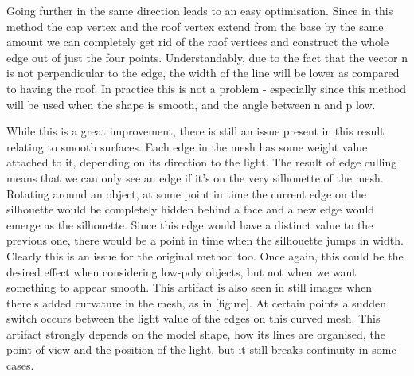 \documentclass[a4paper, 12pt]{article}
\begin{document}
Going further in the same direction leads to an easy optimisation. Since in this method the cap vertex and the roof vertex extend from the base by the same amount we can  completely get rid of the roof vertices and  construct the whole edge out of just the four points. Understandably, due to the fact that the vector n is not perpendicular to the edge, the width of the line will be lower as compared to having the roof. In practice this is not a problem - especially since this method will be used when the shape is smooth, and the angle between n and p low.

While this is a great improvement, there is still an issue present in this result relating to smooth surfaces. Each edge in the mesh has some weight value attached to it, depending on its direction to the light. The result of edge culling means that we can only see an edge if it's on the very silhouette of the mesh. Rotating around an object, at some point in time the current edge on the silhouette would be completely hidden behind a face and a new edge would emerge as the silhouette. Since this edge would have a distinct value to the previous one, there would be a point in time when the silhouette jumps in width. Clearly this is an issue for the original method too. Once again, this could be the desired effect when considering low-poly objects, but not when we want something to appear smooth. This artifact is also seen in still images when there's added curvature in the mesh, as in [figure]. At certain points a sudden switch occurs between the light value of the edges on this curved mesh. This artifact strongly depends on the model shape, how its lines are organised, the point of view and the position of the light, but it still breaks continuity in some cases.
\end{document}
